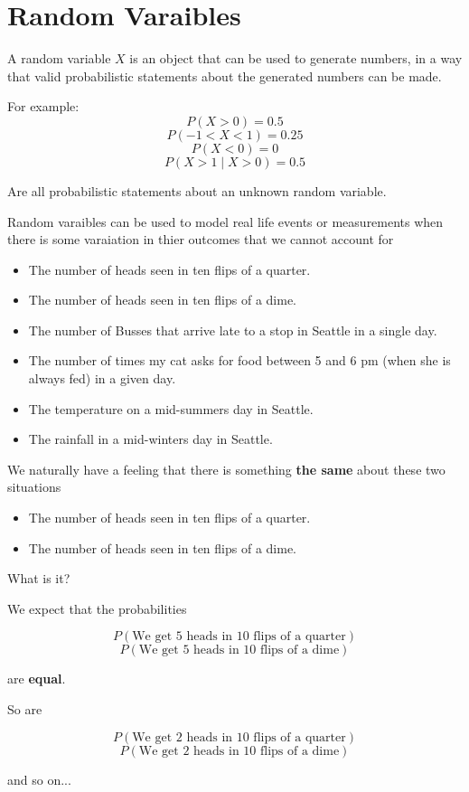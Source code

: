 \section{Random Varaibles}

\begin{frame}
A random variable $X$ is an object that can be used to generate numbers, in a way that valid probabilistic statements about the generated numbers can be made. 

For example:
$$ P(X > 0) = 0.5 $$
$$ P(-1 < X < 1) = 0.25 $$
$$ P(X < 0) = 0 $$
$$ P(X > 1 \mid X > 0) = 0.5 $$

Are all probabilistic statements about an unknown random variable.
\end{frame}
%

%
\begin{frame}
Random varaibles can be used to model real life events or measurements when
there is some varaiation in thier outcomes that we cannot account for

\begin{itemize}
\item The number of heads seen in ten flips of a quarter.
\item The number of heads seen in ten flips of a dime.
\item The number of Busses that arrive late to a stop in Seattle in a single
day.
\item The number of times my cat asks for food between 5 and 6 pm (when she is
always fed) in a given day.
\item The temperature on a mid-summers day in Seattle.
\item The rainfall in a mid-winters day in Seattle.
\end{itemize}

\end{frame}
%

%
\begin{frame}
We naturally have a feeling that there is something \textbf{the same} about
these two situations

\begin{itemize}
\item The number of heads seen in ten flips of a quarter.
\item The number of heads seen in ten flips of a dime.
\end{itemize}

What is it?
\end{frame}
%

%
\begin{frame}

We expect that the probabilities

$$ P(\text{We get 5 heads in 10 flips of a quarter}) $$
$$ P(\text{We get 5 heads in 10 flips of a dime}) $$

are \textbf{equal}.

So are

$$ P(\text{We get 2 heads in 10 flips of a quarter}) $$
$$ P(\text{We get 2 heads in 10 flips of a dime}) $$

and so on...
\end{frame}
%

